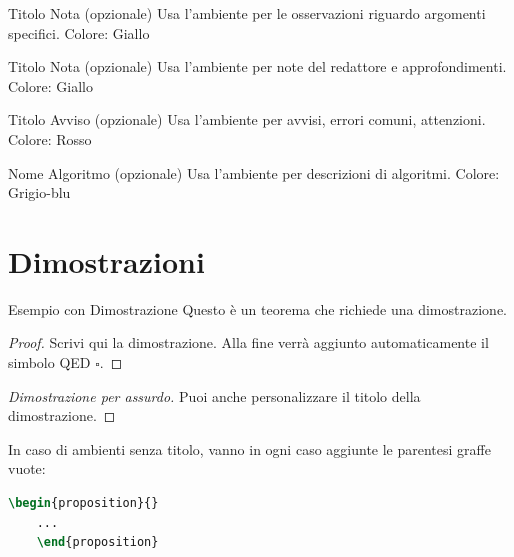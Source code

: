 \documentclass{csnotes}
\begin{document}
\begin{observation}{Titolo Nota (opzionale)}
Usa l'ambiente  per le osservazioni riguardo argomenti specifici.
Colore: Giallo
\end{observation}

\begin{note}{Titolo Nota (opzionale)}
Usa l'ambiente  per note del redattore e approfondimenti.
Colore: Giallo
\end{note}

\begin{warning}{Titolo Avviso (opzionale)}
Usa l'ambiente  per avvisi, errori comuni, attenzioni.
Colore: Rosso
\end{warning}

\begin{algorithmdesc}{Nome Algoritmo (opzionale)}
Usa l'ambiente  per descrizioni di algoritmi.
Colore: Grigio-blu
\end{algorithmdesc}


\section{Dimostrazioni}

\begin{theorem}[label=thm:esempio]{Esempio con Dimostrazione}
Questo è un teorema che richiede una dimostrazione.
\end{theorem}

\begin{proof}
Scrivi qui la dimostrazione. Alla fine verrà aggiunto automaticamente
il simbolo QED \(\square\).
\end{proof}

\begin{proof}[Dimostrazione per assurdo]
Puoi anche personalizzare il titolo della dimostrazione.
\end{proof}

\begin{warning}{}
  In caso di ambienti senza titolo, vanno in ogni caso aggiunte le parentesi graffe vuote:
  \begin{lstlisting}[language=TeX]
    \begin{proposition}{}
    ...
    \end{proposition}
  \end{lstlisting}
\end{warning}
\end{document}
